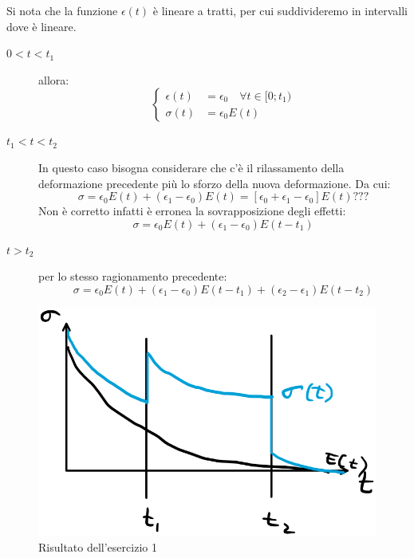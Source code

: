 Si nota che la funzione $\epsilon(t)$ è lineare a tratti, per cui suddivideremo in intervalli dove è lineare.
\begin{description}
\item[$0 < t < t_1$] allora:
\begin{equation}
\begin{cases}
\epsilon(t) &= \epsilon_0 \quad \forall t \in [0;t_1)\\
\sigma(t) &= \epsilon_0 E(t)
\end{cases}
\end{equation}
\item[$t_1 < t < t_2$]
In questo caso bisogna considerare che c'è il rilassamento della deformazione precedente più lo sforzo della nuova deformazione.
Da cui:
\begin{equation}
\sigma = \epsilon_0E(t) + (\epsilon_1 - \epsilon_0)E(t) = [\epsilon_0 + \epsilon_1 - \epsilon_0]E(t)???
\end{equation}
Non è corretto infatti è erronea la sovrapposizione degli effetti:
\begin{equation}
\sigma = \epsilon_0E(t) + (\epsilon_1 - \epsilon_0)E(t-t_1)
\end{equation}
\item[$t>t_2$] per lo stesso ragionamento precedente:
\begin{equation}
\sigma = \epsilon_0E(t) + (\epsilon_1 - \epsilon_0)E(t-t_1) + (\epsilon_2 - \epsilon_1)E(t - t_2)
\end{equation}
\end{description}

\begin{figure}
\centering
\includegraphics[width = \textwidth]{gfx/Risultato1}
\caption{Risultato dell'esercizio 1}
\label{fig:Risultato1}
\end{figure}

